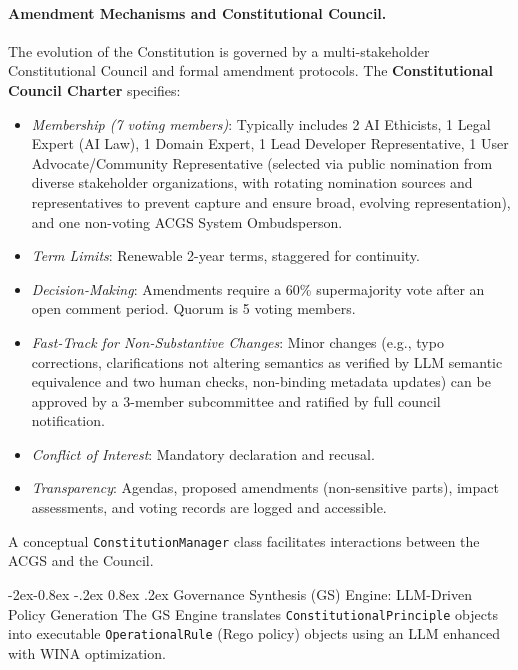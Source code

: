 \documentclass[manuscript,screen,review,anonymous,9pt]{acmart}
\makeatletter
\renewcommand\subsubsection{\@startsection{subsubsection}{3}{\z@}%
  {-2ex\@plus -0.8ex \@minus -.2ex}%
  {0.8ex \@plus .2ex}%
  {\normalfont\normalsize\bfseries}}
\makeatother
\begin{document}
\paragraph{Amendment Mechanisms and Constitutional Council.} The evolution of the Constitution is governed by a multi-stakeholder Constitutional Council and formal amendment protocols.
The \textbf{Constitutional Council Charter} specifies:
\begin{itemize}[leftmargin=*,itemsep=1pt,parsep=1pt]
    \item \textit{Membership (7 voting members)}: Typically includes 2 AI Ethicists, 1 Legal Expert (AI Law), 1 Domain Expert, 1 Lead Developer Representative, 1 User Advocate/Community Representative (selected via public nomination from diverse stakeholder organizations, with rotating nomination sources and representatives to prevent capture and ensure broad, evolving representation), and one non-voting ACGS System Ombudsperson.
    \item \textit{Term Limits}: Renewable 2-year terms, staggered for continuity.
    \item \textit{Decision-Making}: Amendments require a 60\% supermajority vote after an open comment period. Quorum is 5 voting members.
    \item \textit{Fast-Track for Non-Substantive Changes}: Minor changes (e.g., typo corrections, clarifications not altering semantics as verified by LLM semantic equivalence and two human checks, non-binding metadata updates) can be approved by a 3-member subcommittee and ratified by full council notification.
    \item \textit{Conflict of Interest}: Mandatory declaration and recusal.
    \item \textit{Transparency}: Agendas, proposed amendments (non-sensitive parts), impact assessments, and voting records are logged and accessible.
\end{itemize}
A conceptual \texttt{ConstitutionManager} class facilitates interactions between the ACGS and the Council.

\subsubsection{Governance Synthesis (GS) Engine: LLM-Driven Policy Generation}
\label{subsubsec:gs_engine_layer}
The GS Engine translates \texttt{ConstitutionalPrinciple} objects into executable \texttt{OperationalRule} (Rego policy) objects using an LLM enhanced with WINA optimization.
\end{document}
